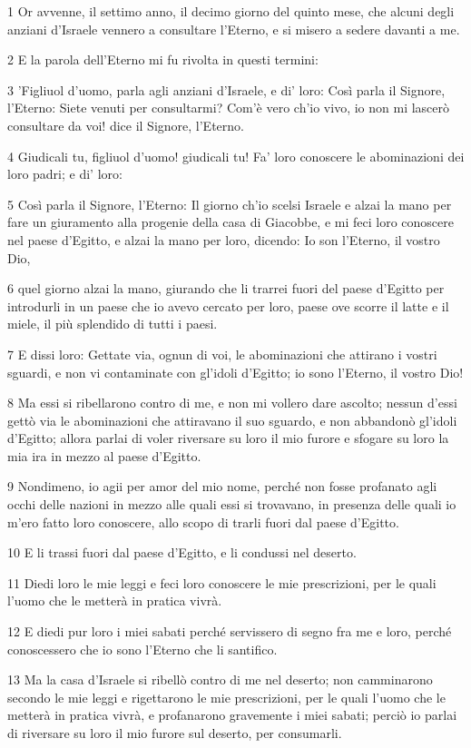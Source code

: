 \par 1 Or avvenne, il settimo anno, il decimo giorno del quinto mese, che alcuni degli anziani d'Israele vennero a consultare l'Eterno, e si misero a sedere davanti a me.
\par 2 E la parola dell'Eterno mi fu rivolta in questi termini:
\par 3 'Figliuol d'uomo, parla agli anziani d'Israele, e di' loro: Così parla il Signore, l'Eterno: Siete venuti per consultarmi? Com'è vero ch'io vivo, io non mi lascerò consultare da voi! dice il Signore, l'Eterno.
\par 4 Giudicali tu, figliuol d'uomo! giudicali tu! Fa' loro conoscere le abominazioni dei loro padri; e di' loro:
\par 5 Così parla il Signore, l'Eterno: Il giorno ch'io scelsi Israele e alzai la mano per fare un giuramento alla progenie della casa di Giacobbe, e mi feci loro conoscere nel paese d'Egitto, e alzai la mano per loro, dicendo: Io son l'Eterno, il vostro Dio,
\par 6 quel giorno alzai la mano, giurando che li trarrei fuori del paese d'Egitto per introdurli in un paese che io avevo cercato per loro, paese ove scorre il latte e il miele, il più splendido di tutti i paesi.
\par 7 E dissi loro: Gettate via, ognun di voi, le abominazioni che attirano i vostri sguardi, e non vi contaminate con gl'idoli d'Egitto; io sono l'Eterno, il vostro Dio!
\par 8 Ma essi si ribellarono contro di me, e non mi vollero dare ascolto; nessun d'essi gettò via le abominazioni che attiravano il suo sguardo, e non abbandonò gl'idoli d'Egitto; allora parlai di voler riversare su loro il mio furore e sfogare su loro la mia ira in mezzo al paese d'Egitto.
\par 9 Nondimeno, io agii per amor del mio nome, perché non fosse profanato agli occhi delle nazioni in mezzo alle quali essi si trovavano, in presenza delle quali io m'ero fatto loro conoscere, allo scopo di trarli fuori dal paese d'Egitto.
\par 10 E li trassi fuori dal paese d'Egitto, e li condussi nel deserto.
\par 11 Diedi loro le mie leggi e feci loro conoscere le mie prescrizioni, per le quali l'uomo che le metterà in pratica vivrà.
\par 12 E diedi pur loro i miei sabati perché servissero di segno fra me e loro, perché conoscessero che io sono l'Eterno che li santifico.
\par 13 Ma la casa d'Israele si ribellò contro di me nel deserto; non camminarono secondo le mie leggi e rigettarono le mie prescrizioni, per le quali l'uomo che le metterà in pratica vivrà, e profanarono gravemente i miei sabati; perciò io parlai di riversare su loro il mio furore sul deserto, per consumarli.
